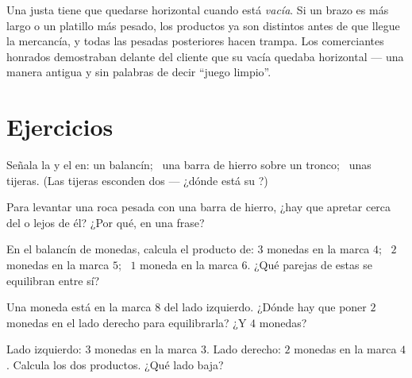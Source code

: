 \begin{remark}\label{rem:g3:levers-and-scales:fair}
Una  justa tiene que quedarse horizontal cuando está
\emph{vacía}. Si un brazo es más largo o un platillo más pesado, los
productos ya son distintos antes de que llegue la mercancía, y todas
las pesadas posteriores hacen trampa. Los comerciantes honrados
demostraban delante del cliente que su  vacía quedaba
horizontal --- una manera antigua y sin palabras de decir ``juego
limpio''.
\end{remark}

\section{Ejercicios}

\begin{exercise}[$\star$]\label{exo:g3:levers-and-scales:1}
Señala la  y el  en: un balancín; \ una barra
de hierro sobre un tronco; \ unas tijeras. (Las tijeras esconden dos
 --- ¿dónde está su ?)
\end{exercise}

\begin{exercise}[$\star$]\label{exo:g3:levers-and-scales:2}
Para levantar una roca pesada con una barra de hierro, ¿hay que
apretar cerca del  o lejos de él? ¿Por qué, en una
frase?
\end{exercise}

\begin{exercise}[$\star$]\label{exo:g3:levers-and-scales:3}
En el balancín de monedas, calcula el producto de: $3$ monedas en la
marca $4$; \ $2$ monedas en la marca $5$; \ $1$ moneda en la marca
$6$. ¿Qué parejas de estas se equilibran entre sí?
\end{exercise}

\begin{exercise}[$\star$]\label{exo:g3:levers-and-scales:4}
Una moneda está en la marca $8$ del lado izquierdo. ¿Dónde hay que
poner $2$ monedas en el lado derecho para equilibrarla? ¿Y $4$
monedas?
\end{exercise}

\begin{exercise}[$\star$]\label{exo:g3:levers-and-scales:5}
Lado izquierdo: $3$ monedas en la marca $3$. Lado derecho: $2$
monedas en la marca $4$. Calcula los dos productos. ¿Qué lado baja?
\end{exercise}

